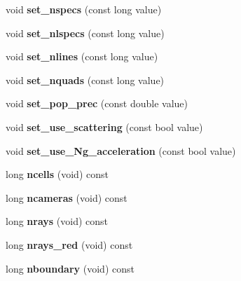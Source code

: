 \begin{DoxyCompactItemize}
void {\bfseries set\+\_\+nspecs} (const long value)
\item 
\mbox{\label{classParameters_a2661a3dbd765a9d2af876470d34dbae2}} 
void {\bfseries set\+\_\+nlspecs} (const long value)
\item 
\mbox{\label{classParameters_abaa5011b841c89ba28ac0e884003ff87}} 
void {\bfseries set\+\_\+nlines} (const long value)
\item 
\mbox{\label{classParameters_ac505977b196477ab248450ef6ec32b53}} 
void {\bfseries set\+\_\+nquads} (const long value)
\item 
\mbox{\label{classParameters_a6b57ecff227f0cdb00b450a6e6ef0b15}} 
void {\bfseries set\+\_\+pop\+\_\+prec} (const double value)
\item 
\mbox{\label{classParameters_ae51213e1215d5726d2ae7c750ca02a42}} 
void {\bfseries set\+\_\+use\+\_\+scattering} (const bool value)
\item 
\mbox{\label{classParameters_a5a0e60bfdbb1251a95633bc13c98edce}} 
void {\bfseries set\+\_\+use\+\_\+\+Ng\+\_\+acceleration} (const bool value)
\item 
\mbox{\label{classParameters_a9a11a2bca19314d9695a5779613e9df1}} 
long {\bfseries ncells} (void) const
\item 
\mbox{\label{classParameters_a2b531cdc89dc6123ceafb91480b1b419}} 
long {\bfseries ncameras} (void) const
\item 
\mbox{\label{classParameters_a15904d79702bcd72b73fb2049b8f1487}} 
long {\bfseries nrays} (void) const
\item 
\mbox{\label{classParameters_a9d15d3cd204c374edb7f9d5797b3d06a}} 
long {\bfseries nrays\+\_\+red} (void) const
\item 
\mbox{\label{classParameters_a3c0519629ec48c9003e599c168f72f26}} 
long {\bfseries nboundary} (void) const
\item 
\mbox{\label{classParameters_a54cc7ff6fd465c9d3f873455edec7136}} 

\end{DoxyCompactItemize}
